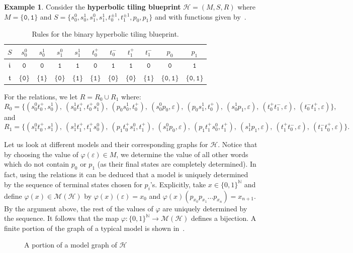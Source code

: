 \documentclass{article}
\theoremstyle{definition}
\newtheorem{example}[theorem]{Example} %
\theoremstyle{definition}
\newcommand{\N}{\mathbb{N}}
\newcommand{\M}{\mathcal{M}}
\newcommand{\init}{\mathfrak{i}}
\newcommand{\ter}{\mathfrak{t}}
\newcommand{\define}[1]{\textbf{#1}}
\begin{document}
\begin{example}\label{ex:hyperbolic_tilings}
    Consider the \define{hyperbolic tiling blueprint} $\mathcal{H} = (M,S,R)$ where $M = \{\texttt{0},\texttt{1}\}$ and $S = \{s_{0}^0, s_{0}^1, s_{1}^0, s_{1}^1, t^{\pm1}_0, t^{\pm1}_1, p_0, p_1\}$ and with functions given by~.
    \begin{table}[ht!]
			\centering
			\begin{tabular}{|c||c|c|c|c|c|c|c|c|c|c|}
				\hline
				$S$ & $s_0^0$ & $s_0^1$ & $s_1^0$& $s_1^1$ & $t_0^{+}$ & $t_0^{-}$ & $t_1^{+}$ & $t_1^{-}$ & $p_0$ & $p_1$\\
				\hline
				$\init$ & $\texttt{0}$ & $\texttt{0}$ & $\texttt{1}$ & $\texttt{1}$ & $\texttt{0}$ & $\texttt{1}$ & $\texttt{1}$ & $\texttt{0}$ & $\texttt{0}$ & $\texttt{1}$\\
				\hline
				$\ter$ & $\{\texttt{0}\}$ & $\{\texttt{1}\}$ & $\{\texttt{0}\}$ & $\{\texttt{1}\}$ & $\{\texttt{1}\}$ & $\{\texttt{0}\}$ & $\{\texttt{0}\}$ & $\{\texttt{1}\}$ & $\{\texttt{0},\texttt{1}\}$& $\{\texttt{0},\texttt{1}\}$\\
				\hline
			\end{tabular}
   \caption{Rules for the binary hyperbolic tiling blueprint.}
        \label{table:rules_for_hyperbolic plane}
		\end{table}

    For the relations, we let $R = R_0 \cup R_1$ where:
    \[R_0 = \{(s_0^0 t^{+}_0,s_0^1), \ (s_{0}^1t^{+}_1,t^{+}_0 s_1^0), \ (p_0 s_0^1,t^{+}_0), \ (s_0^0p_0,\varepsilon), \ (p_0s_1^1,t^{+}_0), \ (s_0^1 p_1,\varepsilon), \ (t_0^{+}t_1^{-},\varepsilon), \ (t_0^{-}t^{+}_1,\varepsilon)\},\]
    and 
    \[R_1 = \{(s_1^0 t^{+}_0,s_1^1), \ (s_{1}^1t^{+}_1,t^{+}_1 s_0^0), \ (p_1 t^{+}_0 s_1^0,t^{+}_1), \ (s_1^0p_0,\varepsilon), \ (p_1t^{+}_1s_0^0,t^{+}_1), \ (s_1^1 p_1,\varepsilon), \ (t^{+}_1t_0^{-},\varepsilon), \ (t_1^{-}t^{+}_0,\varepsilon)\}.\]

     Let us look at different models and their corresponding graphs for $\mathcal{H}$. Notice that by choosing the value of $\varphi(\varepsilon)\in M$, we determine the value of all other words which do not contain $p_0$ or $p_1$ (as their final states are completely determined). In fact, using the relations it can be deduced that a model is uniquely determined by the sequence of terminal states chosen for $p_i$'s. Explicitly, take $x\in\{0,1\}^\N$ and define $\varphi(x)\in\M(\mathcal{H})$ by $\varphi(x)(\varepsilon) = x_0$ and $\varphi(x)(p_{x_0}p_{x_1}\dots p_{x_n}) = x_{n+1}$. By the argument above, the rest of the values of $\varphi$ are uniquely determined by the sequence. It follows that the map $\varphi\colon\{0,1\}^\N \to \M(\mathcal{H})$ defines a bijection. A finite portion of the graph of a typical model is shown in~.
    
\begin{figure}[H]
    \centering
    
    \caption{A portion of a model graph of $\mathcal{H}$}
    \label{fig:hyper}
\end{figure}
\end{example}
\end{document}

